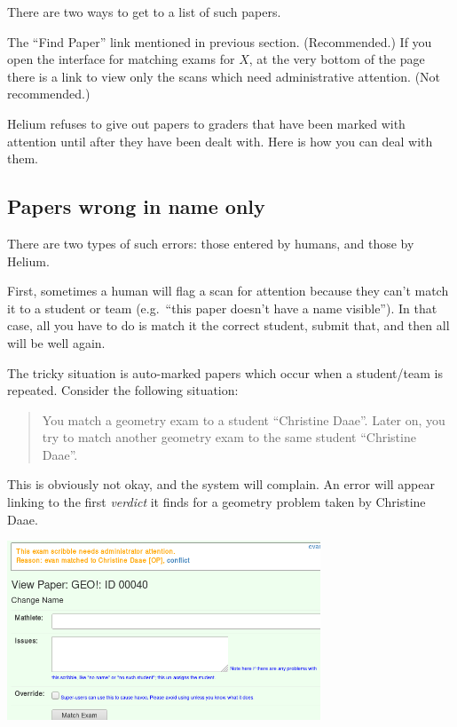 There are two ways to get to a list of such papers.
\begin{itemize}
	\ii The ``Find Paper'' link mentioned in previous section. (Recommended.)
	\ii If you open the interface for matching exams for $X$,
	at the very bottom of the page there is a link
	to view only the scans which need administrative attention.
	(Not recommended.)
\end{itemize}
Helium refuses to give out papers to graders
that have been marked with attention until after they have been dealt with.
Here is how you can deal with them.

\subsection{Papers wrong in name only}
There are two types of such errors:
those entered by humans, and those by Helium.

First, sometimes a human will flag a scan for attention
because they can't match it to a student or team
(e.g.\ ``this paper doesn't have a name visible'').
In that case, all you have to do is match it the correct student,
submit that, and then all will be well again.

The tricky situation is auto-marked papers
which occur when a student/team is repeated.
Consider the following situation:
\begin{quote}
	You match a geometry exam to a student ``Christine Daae''.  
	Later on, you try to match another geometry exam
	to the same student ``Christine Daae''.
\end{quote}
This is obviously not okay, and the system will complain.
An error will appear linking to the first \emph{verdict}
it finds for a geometry problem taken by Christine Daae.

\begin{center}
	\includegraphics[width=0.7\textwidth]{images/conflict2.png}
\end{center}

